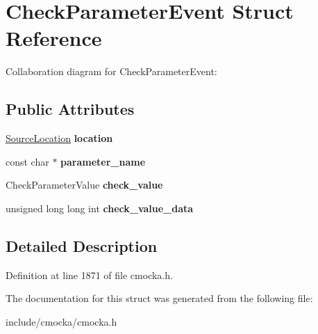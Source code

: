 \hypertarget{structCheckParameterEvent}{}\section{Check\+Parameter\+Event Struct Reference}
\label{structCheckParameterEvent}


Collaboration diagram for Check\+Parameter\+Event\+:
\subsection*{Public Attributes}
\begin{DoxyCompactItemize}
\item 
\mbox{\label{structCheckParameterEvent_afc7dc3d8ae3fcfd65b8b91cfe69f5538}} 
\hyperlink{structSourceLocation}{Source\+Location} {\bfseries location}
\item 
\mbox{\label{structCheckParameterEvent_ae8b4f5e2577e0f749da52a10ac8be8bf}} 
const char $\ast$ {\bfseries parameter\+\_\+name}
\item 
\mbox{\label{structCheckParameterEvent_a2328aae7eccb900e6f3329b7a5e34461}} 
Check\+Parameter\+Value {\bfseries check\+\_\+value}
\item 
\mbox{\label{structCheckParameterEvent_a3641ddfccd5868c1db7225cd4fe3d10b}} 
unsigned long long int {\bfseries check\+\_\+value\+\_\+data}
\end{DoxyCompactItemize}


\subsection{Detailed Description}


Definition at line 1871 of file cmocka.\+h.



The documentation for this struct was generated from the following file\+:\begin{DoxyCompactItemize}
\item 
include/cmocka/cmocka.\+h\end{DoxyCompactItemize}
